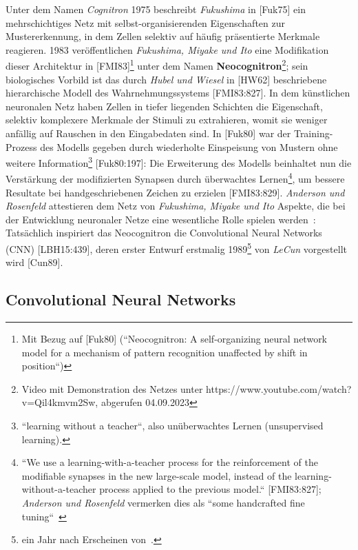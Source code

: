 Unter dem Namen \textit{Cognitron} 1975 beschreibt \textit{Fukushima} in [Fuk75] ein mehrschichtiges Netz mit selbst-organisierenden Eigenschaften zur Mustererkennung, in dem Zellen selektiv auf häufig präsentierte Merkmale reagieren.
1983 veröffentlichen \textit{Fukushima, Miyake und Ito} eine Modifikation dieser Architektur in [FMI83]\footnote{
    Mit Bezug auf [Fuk80] (``Neocognitron: A self-organizing neural network model for a mechanism of pattern recognition unaffected by shift in position``)
} unter dem Namen \textbf{Neocognitron}\footnote{
    Video mit Demonstration des Netzes unter https://www.youtube.com/watch?v=Qil4kmvm2Sw, abgerufen 04.09.2023
}; sein biologisches Vorbild ist das durch \textit{Hubel und Wiesel} in [HW62] beschriebene hierarchische Modell des Wahrnehmungssystems [FMI83:827].
In dem künstlichen neuronalen Netz haben Zellen in tiefer liegenden Schichten die Eigenschaft, selektiv komplexere Merkmale der Stimuli zu extrahieren, womit sie weniger anfällig auf Rauschen in den Eingabedaten sind.
In [Fuk80] war der Training-Prozess des Modells gegeben durch wiederholte Einspeisung von Mustern ohne weitere Information\footnote{
    ``learning without a teacher``, also unüberwachtes Lernen (unsupervised learning).
} [Fuk80:197]: Die Erweiterung des Modells beinhaltet nun die Verstärkung der modifizierten Synapsen durch überwachtes Lernen\footnote{
    ``We use a learning-with-a-teacher process for the reinforcement of the modifiable synapses in the new large-scale
model, instead of the learning-without-a-teacher process applied to the previous model.`` [FMI83:827]; \textit{Anderson und Rosenfeld} vermerken dies als ``some handcrafted fine tuning``~\cite[524 f.]{ARR88}
}, um bessere Resultate bei handgeschriebenen Zeichen zu erzielen [FMI83:829].
\textit{Anderson und Rosenfeld} attestieren dem Netz von \textit{Fukushima, Miyake und Ito} Aspekte, die bei der Entwicklung neuronaler Netze eine wesentliche Rolle spielen werden~\cite[524]{ARR88}:  Tatsächlich inspiriert das Neocognitron die Convolutional Neural Networks (CNN) [LBH15:439], deren erster Entwurf erstmalig 1989\footnote{
    ein Jahr nach Erscheinen von~\cite{AR88}.
} von \textit{LeCun} vorgestellt wird [Cun89].



\subsection{Convolutional Neural Networks}\label{cnn}

